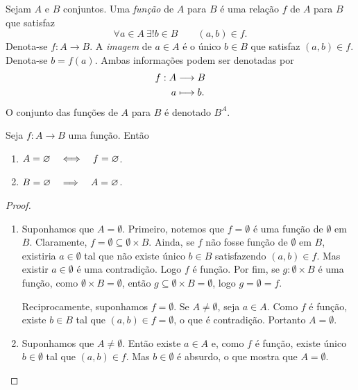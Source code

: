 \begin{defi}
Sejam $A$ e $B$ conjuntos. Uma \emph{função} de $A$ para $B$ é uma relação $f$ de $A$ para $B$ que satisfaz
	\begin{equation*}
	\forall a \in A \ \exists! b \in B \qquad (a,b) \in f.
	\end{equation*}
Denota-se $f: A \to B$. A \emph{imagem} de $a \in A$ é o único $b \in B$ que satisfaz $(a,b) \in f$. Denota-se $b=f(a)$. Ambas informações podem ser denotadas por
	\begin{align*}
	{f}: {A} &\longrightarrow {B} \\{a} &\longmapsto {b}.
	\end{align*}
O conjunto das funções de $A$ para $B$ é denotado $B^A$.
\end{defi}

\begin{prop}
Seja $f: A \to B$ uma função. Então
	\begin{enumerate}
	\item $A=\varnothing \quad \Longleftrightarrow \quad f=\varnothing$.
	\item $B=\varnothing \quad \Longrightarrow \quad A=\varnothing$.
	\end{enumerate}
\end{prop}
\begin{proof}
	\begin{enumerate}
	\item Suponhamos que $A=\emptyset$. Primeiro, notemos que $f=\emptyset$ é uma função de $\emptyset$ em $B$. Claramente, $f = \emptyset \subseteq \emptyset \times B$. Ainda, se $f$ não fosse função de $\emptyset$ em $B$, existiria $a \in \emptyset$ tal que não existe único $b \in B$ satisfazendo $(a,b) \in f$. Mas existir $a \in \emptyset$ é uma contradição. Logo $f$ é função. Por fim, se $g: \emptyset \times B$ é uma função, como $\emptyset \times B = \emptyset$, então $g \subseteq \emptyset \times B = \emptyset$, logo $g=\emptyset=f$.
	
Reciprocamente, suponhamos $f=\emptyset$. Se $A \neq \emptyset$, seja $a \in A$. Como $f$ é função, existe $b \in B$ tal que $(a,b) \in f=\emptyset$, o que é contradição. Portanto $A=\emptyset$.
	
	\item Suponhamos que $A \neq \emptyset$. Então existe $a \in A$ e, como $f$ é função, existe único $b \in \emptyset$ tal que $(a,b) \in f$. Mas $b \in \emptyset$ é absurdo, o que mostra que $A = \emptyset$.
	\end{enumerate}
\end{proof}

